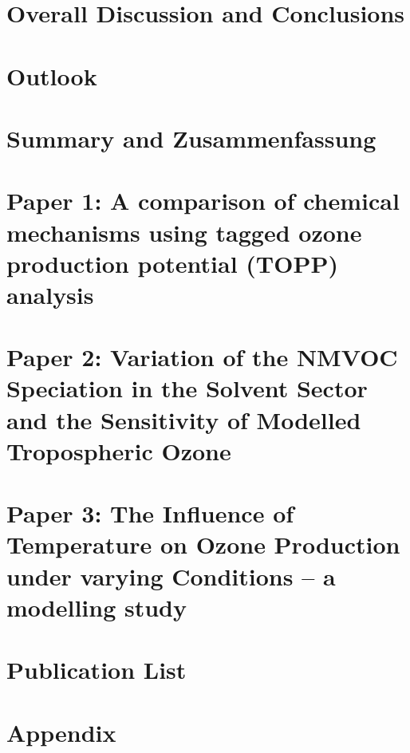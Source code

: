 \documentclass[12pt,twoside,openright,a4paper]{report}
\begin{document}
\chapter{Overall Discussion and Conclusions} \label{c:conclusions}

\clearpage{\pagestyle{empty}\cleardoublepage}

\chapter{Outlook} \label{c:outlook}

\clearpage{\pagestyle{empty}\cleardoublepage}

\chapter{Summary and Zusammenfassung} \label{c:summary}
\clearpage{\pagestyle{empty}\cleardoublepage}


 
\clearpage{\pagestyle{empty}\cleardoublepage}

\chapter{Paper 1: A comparison of chemical mechanisms using tagged ozone production potential (TOPP) analysis} \label{c:paper_1}
\clearpage{\pagestyle{empty}\cleardoublepage}



\chapter{Paper 2: Variation of the NMVOC Speciation in the Solvent Sector and the Sensitivity of Modelled Tropospheric Ozone} \label{c:paper_2}
\clearpage{\pagestyle{empty}\cleardoublepage}



\chapter{Paper 3: The Influence of Temperature on Ozone Production under varying  Conditions -- a modelling study} \label{c:paper_3}
\clearpage{\pagestyle{empty}\cleardoublepage}

\chapter{Publication List}
\clearpage{\pagestyle{empty}\cleardoublepage}

\chapter*{Appendix}
\clearpage{\pagestyle{empty}\cleardoublepage}
\end{document}
